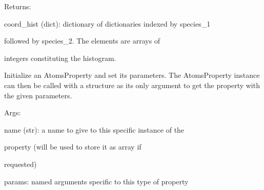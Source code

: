 \documentclass[letterpaper,10pt,english]{sphinxmanual}
\begin{document}
\begin{fulllineitems}
\begin{DUlineblock}{0em}
\item[] Returns:
\item[]
\begin{DUlineblock}{\DUlineblockindent}
\item[] coord\_hist (dict): dictionary of dictionaries indexed by species\_1
\item[]
\begin{DUlineblock}{\DUlineblockindent}
\item[] followed by species\_2. The elements are arrays of
\item[] integers constituting the histogram.
\end{DUlineblock}
\end{DUlineblock}
\end{DUlineblock}

Initialize an AtomsProperty and set its parameters.
The AtomsProperty instance can then be called with a structure as its
only argument to get the property with the given parameters.

\begin{DUlineblock}{0em}
\item[] Args:
\item[]
\begin{DUlineblock}{\DUlineblockindent}
\item[] name (str): a name to give to this specific instance of the
\item[]
\begin{DUlineblock}{\DUlineblockindent}
\item[] property (will be used to store it as array if
\item[] requested)
\end{DUlineblock}
\item[] params: named arguments specific to this type of property
\end{DUlineblock}
\end{DUlineblock}

\begin{fulllineitems}
\label{doctree/soprano.properties.linkage.linkage:soprano.properties.linkage.linkage.CoordinationHistogram.default_name}
\end{fulllineitems}



\end{fulllineitems}
\end{document}
